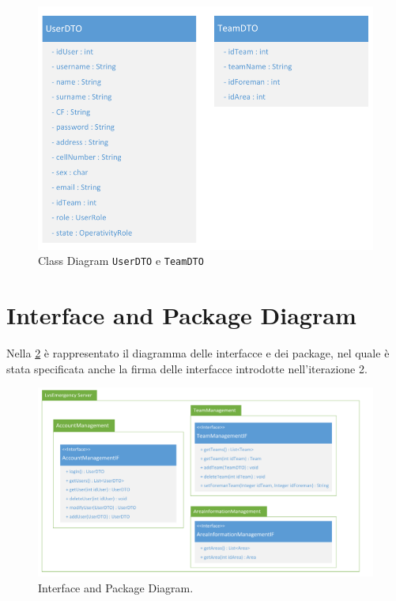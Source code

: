 \begin{figure}[h!]
	\centering
	\includegraphics[width=0.8\linewidth]{./Iterazione 2/OtherFiles/DTOSpecification}
	\caption{Class Diagram \texttt{UserDTO} e \texttt{TeamDTO}}
	\label{fig:ClassDiagramDTO_iterazione2}
\end{figure}

\clearpage

\section{Interface and Package Diagram}
Nella \Fig\ref{fig:InterfaceDiagram_iterazione2} è rappresentato il diagramma delle interfacce e dei package, nel quale è stata specificata anche la firma delle interfacce introdotte nell'iterazione 2.

\begin{figure}[h]
	\centering
	\includegraphics[width=1\linewidth]{./Iterazione 2/OtherFiles/UML - Interface Diagram}
	\caption{Interface and Package Diagram.}
	\label{fig:InterfaceDiagram_iterazione2}
\end{figure}

